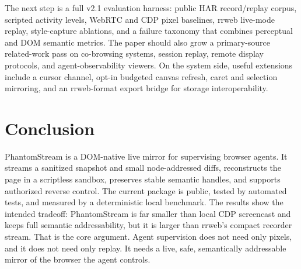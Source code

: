 \documentclass[conference]{IEEEtran}
\begin{document}
The next step is a full v2.1 evaluation harness: public HAR record/replay corpus,
scripted activity levels, WebRTC and CDP pixel baselines, rrweb live-mode replay,
style-capture ablations, and a failure taxonomy that combines perceptual and DOM
semantic metrics. The paper should also grow a primary-source related-work pass
on co-browsing systems, session replay, remote display protocols, and
agent-observability viewers. On the system side, useful extensions include a
cursor channel, opt-in budgeted canvas refresh, caret and selection mirroring,
and an rrweb-format export bridge for storage interoperability.

\section{Conclusion}

PhantomStream is a DOM-native live mirror for supervising browser agents. It
streams a sanitized snapshot and small node-addressed diffs, reconstructs the
page in a scriptless sandbox, preserves stable semantic handles, and supports
authorized reverse control. The current package is public, tested by
\PSTestCount{} automated tests, and measured by a deterministic local benchmark.
The results show the intended tradeoff: PhantomStream is far smaller than local
CDP screencast and keeps full semantic addressability, but it is larger than
rrweb's compact recorder stream. That is the core argument. Agent supervision
does not need only pixels, and it does not need only replay. It needs a live,
safe, semantically addressable mirror of the browser the agent controls.



\end{document}
